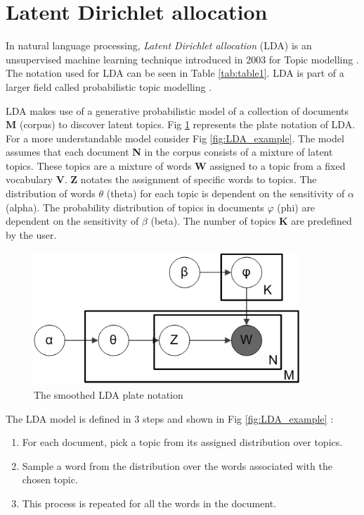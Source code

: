 \section{Latent Dirichlet allocation}\label{theory:lda}
In natural language processing, \textit{Latent Dirichlet allocation} (LDA) is an unsupervised machine learning technique introduced in 2003 for Topic modelling \cite{Blei2003}.
The notation used for LDA can be seen in Table \ref{tab:table1}. LDA is part of a larger field called probabilistic topic modelling \cite{Blei2010}.

LDA makes use of a generative probabilistic model of a collection of documents \textbf{M} (corpus) to discover latent topics. Fig \ref{fig:LDA} represents the plate notation of LDA. For a more understandable model consider Fig \ref{fig:LDA_example}. The model assumes that each document \textbf{N} in the corpus consists of a mixture of latent topics. These topics are a mixture of words \textbf{W} assigned to a topic from a fixed vocabulary \textbf{V}. \textbf{Z} notates the assignment of specific words to topics. The distribution of words $\theta$ (theta) for each topic is dependent on the sensitivity of $\alpha$ (alpha). The probability distribution of topics in documents $\varphi$ (phi) are dependent on the sensitivity of $\beta$ (beta). The number of topics \textbf{K} are predefined by the user. 

\begin{figure}
    \centering
    \includegraphics[width=10cm, height=5cm]{methodology/Smoothed_LDA.png}
    \caption{The smoothed LDA plate notation \cite{Blei2003}}
    \label{fig:LDA}
\end{figure}

The LDA model is defined in 3 steps and shown in Fig \ref{fig:LDA_example} \cite{Blei2003}:
\begin{enumerate}
    \item For each document, pick a topic from its assigned distribution over topics.
    \item Sample a word from the distribution over the words associated with the chosen topic. 
    \item This process is repeated for all the words in the document.
\end{enumerate}

